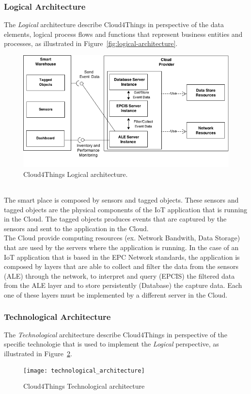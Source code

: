 \subsubsection{Logical Architecture}
\label{subs:logical_architecture}
The \textit{Logical} architecture describe Cloud4Things in perspective of
the data elements, logical process flows and functions that represent business
entities and processes, as illustrated in Figure~\ref{fig:logical-architecture}.
\begin{figure}[h!]
  \centering
  \includegraphics[width=.8\textwidth]{./images/logical-architecture}
  \caption{Cloud4Things Logical architecture.}
  \label{fig:logical_architecture}
  \end{figure}\\
The smart place is composed by sensors and tagged objects. These sensors and tagged
objects are the physical components of the IoT application that is running in the Cloud.
The tagged objects produces events that are captured by the sensors and sent to the
application in the Cloud.\\

The Cloud provide computing resources (ex. Network Bandwith, Data Storage) that
are used by the servers where the application is running. In the case of an IoT
application that is based in the EPC Network standards, the application is composed
by layers that are able to collect and filter the data from the sensors (ALE) through
the network, to interpret and query (EPCIS) the filtered data from the ALE layer and
to store persistently (Database) the capture data. Each one of these layers must
be implemented by a different server in the Cloud.
\subsubsection{Technological Architecture}
\label{subs:technological_architecture}
The \textit{Technological} architecture describe Cloud4Things in perspective of the
specific technologie that is used to implement the \textit{Logical} perspective, as
illustrated in Figure~\ref{fig:technological_architecture}.
\begin{figure}
  \centering
  \texttt{[image: technological\_architecture]}
  \caption{Cloud4Things Technological architecture}
  \label{fig:technological_architecture}
\end{figure}\\
